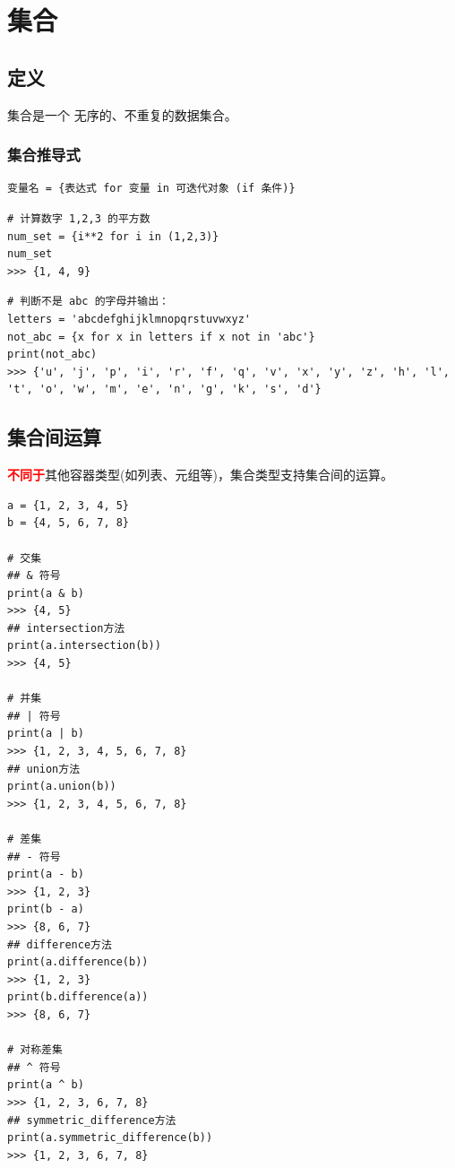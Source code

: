 \section{集合}
\subsection{定义}
集合是一个 \textcolor{YBXPurple}{无序的、不重复}的数据集合。

\subsubsection{集合推导式}
\begin{lstlisting}[style=demostyle,numbers=none]
变量名 = {表达式 for 变量 in 可迭代对象 (if 条件)}
\end{lstlisting}

\begin{lstlisting}[style=pythonstyle]
# 计算数字 1,2,3 的平方数
num_set = {i**2 for i in (1,2,3)}
num_set
>>> {1, 4, 9}
\end{lstlisting}

\begin{lstlisting}[style=pythonstyle]
# 判断不是 abc 的字母并输出：
letters = 'abcdefghijklmnopqrstuvwxyz'
not_abc = {x for x in letters if x not in 'abc'}
print(not_abc)
>>> {'u', 'j', 'p', 'i', 'r', 'f', 'q', 'v', 'x', 'y', 'z', 'h', 'l', 't', 'o', 'w', 'm', 'e', 'n', 'g', 'k', 's', 'd'}
\end{lstlisting}

\subsection{集合间运算}
\textcolor{red}{\textbf{不同于}}其他容器类型(如列表、元组等)，集合类型支持集合间的运算。

\begin{lstlisting}[style=demostyle,numbers=none]
a = {1, 2, 3, 4, 5}
b = {4, 5, 6, 7, 8}

# 交集
## & 符号
print(a & b)
>>> {4, 5}
## intersection方法
print(a.intersection(b))
>>> {4, 5}

# 并集
## | 符号
print(a | b)
>>> {1, 2, 3, 4, 5, 6, 7, 8}
## union方法
print(a.union(b))
>>> {1, 2, 3, 4, 5, 6, 7, 8}

# 差集
## - 符号
print(a - b)
>>> {1, 2, 3}
print(b - a)
>>> {8, 6, 7}
## difference方法
print(a.difference(b))
>>> {1, 2, 3}
print(b.difference(a))
>>> {8, 6, 7}

# 对称差集
## ^ 符号
print(a ^ b)
>>> {1, 2, 3, 6, 7, 8}
## symmetric_difference方法
print(a.symmetric_difference(b))
>>> {1, 2, 3, 6, 7, 8}
\end{lstlisting}

